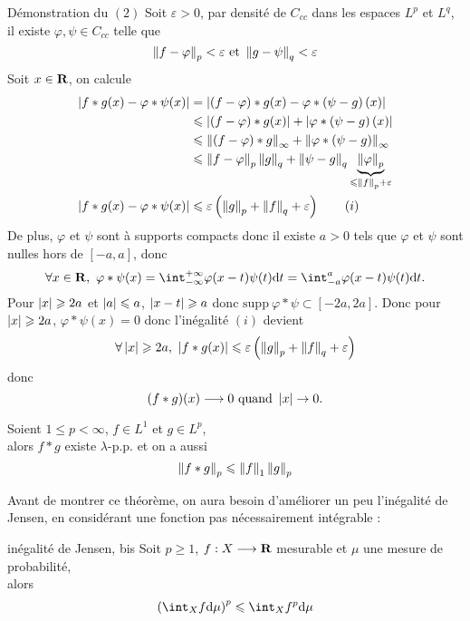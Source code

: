 \documentclass[a4paper,11pt, twoside]{article}
\begin{document}
\begin{ProofC}{Démonstration du $(\mathit 2)$}
  Soit $\varepsilon>0$, par densité de $C_{cc}$ dans les espaces $L^p$ et $L^q$, il existe $\varphi,\psi\in C_{cc}$ telle que 
  $$\left\lVert f-\varphi\right\rVert_p<\varepsilon\text{ et }\left\lVert g-\psi\right\rVert_q<\varepsilon$$
  Soit $x\in\mathbf R$, on calcule 
  \begin{align*}
    \left| f*g(x)-\varphi*\psi(x)\right|&=\left| \left(f-\varphi\right)*g(x)-\varphi*\left(\psi-g\right)(x)\right|\\
    &\leqslant\left| \left(f-\varphi\right)*g(x)\right|+\left| \varphi*\left(\psi-g\right)(x)\right|\\
    &\leqslant\left\lVert\left(f-\varphi\right)*g\right\rVert_\infty+\left\lVert\varphi*\left(\psi-g\right)\right\rVert_\infty\\
    &\leqslant\left\lVert f-\varphi\right\rVert_p\left\lVert g\right\rVert_q+\left\lVert\psi-g\right\rVert_q\underbrace{\left\lVert\varphi\right\rVert_p}_{\leqslant \left\lVert f\right\rVert_p+\varepsilon}\\
    \left| f*g(x)-\varphi*\psi(x)\right|&\leqslant \varepsilon\left(\left\lVert g\right\rVert_p+\left\lVert f\right\rVert_q+\varepsilon\right)\qquad (i)
  \end{align*}
  De plus, $\varphi$ et $\psi$ sont à supports compacts donc il existe $a>0$ tels que $\varphi$ et $\psi$ sont nulles hors de $[-a,a]$, donc
  $$\forall x\in\R,\ \varphi*\psi(x)=\intr\varphi(x-t)\psi(t)\dt=\int_{-a}^a\varphi(x-t)\psi(t)\dt.$$
  Pour $\left| x\right|\geqslant 2a$ et $\left| a\right|\leqslant a$, $\left| x-t\right|\geqslant a$ donc $\mathrm{supp}\ \varphi*\psi\subset[-2a,2a].$
  Donc pour $\left| x\right|\geqslant 2a$, $\varphi*\psi(x)=0$ donc l'inégalité $(i)$ devient 
  $$\forall \abs x\geqslant 2a,\ \abs{f*g(x)}\leqslant \varepsilon\Par{\norm{g}_p+\norm{f}_q+\varepsilon}$$
  donc 
  $$(f*g)(x)\longrightarrow 0\text{ quand }\left| x\right|\to 0.$$
\end{ProofC}


\begin{Th}
  Soient $1\leqslant p<\infty$, $f\in L^1$ et $g\in L^p$,\\

  alors $f*g$ existe $\lambda$-p.p. et on a aussi
  $$\left\lVert f*g\right\rVert_p\leqslant \left\lVert f\right\rVert_1\left\lVert g\right\rVert_p$$
\end{Th}


Avant de montrer ce théorème, on aura besoin d'améliorer un peu l'inégalité de Jensen, en considérant une fonction pas nécessairement intégrable :


\begin{propC}{inégalité de Jensen, bis}
  Soit $p\geqslant 1$, $f:X\longrightarrow\mathbf R$ mesurable et $\mu$ une mesure de probabilité,\\

  alors 
  $$\Par{\int_Xf\dmu}^p\leqslant\int_Xf^p\dmu$$
\end{propC}
\end{document}
